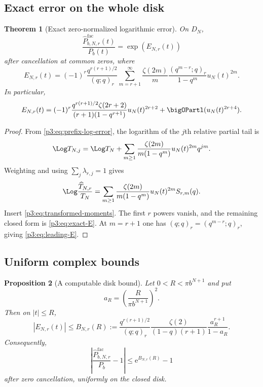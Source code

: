 \documentclass[11pt]{article}
\numberwithin{equation}{section}
\newtheorem{theorem}{Theorem}[section]
\newtheorem{proposition}[theorem]{Proposition}
\theoremstyle{definition}
\theoremstyle{remark}
\newcommand{\e}{\mathrm e}
\begin{document}
\subsection{Exact error on the whole disk}

\begin{theorem}[Exact zero-normalized logarithmic error]\label{p3:thm:exact-error}
On $D_N$,
\begin{equation}
 \frac{\widehat P^{\mathrm{fac}}_{b,N,r}(t)}{P_b(t)}
 =\exp(E_{N,r}(t))
 \label{p3:eq:quotient-error}
\end{equation}
after cancellation at common zeros, where
\begin{equation}
 \boxed{
 E_{N,r}(t)=(-1)^r\frac{q^{r(r+1)/2}}{(q;q)_r}
 \sum_{m=r+1}^{\infty}\frac{\zeta(2m)}{m}
 \frac{(q^{m-r};q)_r}{1-q^m}
 u_N(t)^{2m}.}
 \label{p3:eq:exact-E}
\end{equation}
In particular,
\begin{equation}
 E_{N,r}(t)
 =(-1)^r\frac{q^{r(r+1)/2}\zeta(2r+2)}
 {(r+1)(1-q^{r+1})}u_N(t)^{2r+2}
 +\bigOPartl(u_N(t)^{2r+4}).
 \label{p3:eq:leading-E}
\end{equation}
\end{theorem}

\begin{proof}
From \eqref{p3:eq:prefix-log-error}, the logarithm of the $j$th relative partial tail is
\[
 \Log T_{N,j}
 =\Log T_N+
 \sum_{m\ge1}\frac{\zeta(2m)}{m(1-q^m)}u_N(t)^{2m}q^{jm}.
\]
Weighting and using $\sum_j\lambda_{r,j}=1$ gives
\[
 \Log\frac{\widehat T_{N,r}}{T_N}
 =\sum_{m\ge1}\frac{\zeta(2m)}{m(1-q^m)}u_N(t)^{2m}S_{r,m}(q).
\]
Insert \eqref{p3:eq:transformed-moments}.  The first $r$ powers vanish, and the remaining
closed form is \eqref{p3:eq:exact-E}.  At $m=r+1$ one has
$(q;q)_r=(q^{m-r};q)_r$, giving \eqref{p3:eq:leading-E}.
\end{proof}

\subsection{Uniform complex bounds}

\begin{proposition}[A computable disk bound]\label{p3:prop:disk-bound}
Let $0<R<\pi b^{N+1}$ and put
\[
 a_R=\left(\frac{R}{\pi b^{N+1}}\right)^2.
\]
Then on $|t|\le R$,
\begin{equation}
 |E_{N,r}(t)|\le B_{N,r}(R)
 :=\frac{q^{r(r+1)/2}}{(q;q)_r}
   \frac{\zeta(2)}{(1-q)(r+1)}
   \frac{a_R^{r+1}}{1-a_R}.
 \label{p3:eq:Bbound}
\end{equation}
Consequently,
\begin{equation}
 \left|\frac{\widehat P^{\mathrm{fac}}_{b,N,r}}{P_b}-1\right|
 \le \e^{B_{N,r}(R)}-1
 \label{p3:eq:relative-bound}
\end{equation}
after zero cancellation, uniformly on the closed disk.
\end{proposition}
\end{document}
